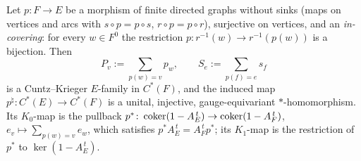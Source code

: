 \begin{lemma}\label{VIII:lem:incov}
Let $p\colon F\to E$ be a morphism of finite directed graphs without sinks (maps on
vertices and arcs with $s\circ p=p\circ s$, $r\circ p=p\circ r$), surjective on vertices,
and an \emph{in-covering}: for every $w\in F^0$ the restriction
$p\colon r^{-1}(w)\to r^{-1}(p(w))$ is a bijection. Then
\[
P_v:=\sum_{p(w)=v}p_w,\qquad S_e:=\sum_{p(f)=e}s_f
\]
is a Cuntz--Krieger $E$-family in $C^*(F)$, and the induced map
$p^{\natural}\colon C^*(E)\to C^*(F)$ is a unital, injective, gauge-equivariant
$*$-homomorphism. Its $K_0$-map is the pullback
$p^*\colon\operatorname{coker}(1-A_E^{\,t})\to\operatorname{coker}(1-A_F^{\,t})$, $e_v\mapsto\sum_{p(w)=v}e_w$, which
satisfies $p^*A_E^{\,t}=A_F^{\,t}p^*$; its $K_1$-map is the restriction of $p^*$ to
$\ker(1-A_E^{\,t})$.
\end{lemma}

